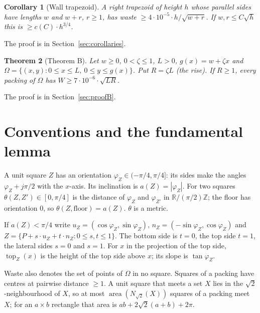 \documentclass[11pt,letterpaper]{amsart}
\theoremstyle{plain}
\newtheorem{theorem}{Theorem}[section]
\newtheorem{corollary}[theorem]{Corollary}
\theoremstyle{definition}
\theoremstyle{remark}
\begin{document}
\begin{corollary}[Wall trapezoid]\label{cor:wall}
A right trapezoid of height $h$ whose parallel sides have lengths $w$ and $w+r$, $r\ge1$, has waste $\ge4\cdot10^{-5}\cdot h/\sqrt{w+r}$. If $w,r\le C\sqrt h$ this is $\ge c(C)\cdot h^{3/4}$.
\end{corollary}
The proof is in Section~\ref{sec:corollaries}.

\begin{theorem}[Theorem B]\label{thm:B}
Let $w\ge0$, $0<\zeta\le1$, $L>0$, $g(x)=w+\zeta x$ and $\Omega=\{(x,y):0\le x\le L,\ 0\le y\le g(x)\}$. Put $R=\zeta L$ (the rise). If $R\ge1$, every packing of $\Omega$ has $W\ge7\cdot10^{-6}\cdot\sqrt{LR}$.
\end{theorem}
The proof is in Section~\ref{sec:proofB}.

\section{Conventions and the fundamental lemma}\label{sec:conventions}
A unit square $Z$ has an orientation $\varphi_Z\in(-\pi/4,\pi/4]$: its sides make the angles $\varphi_Z+j\pi/2$ with the $x$-axis. Its inclination is $a(Z)=|\varphi_Z|$. For two squares $\theta(Z,Z')\in[0,\pi/4]$ is the distance of $\varphi_Z$ and $\varphi_{Z'}$ in $\mathbb R/(\pi/2)\mathbb Z$; the floor has orientation $0$, so $\theta(Z,\text{floor})=a(Z)$. $\theta$ is a metric.

If $a(Z)<\pi/4$ write $u_Z=(\cos\varphi_Z,\sin\varphi_Z)$, $n_Z=(-\sin\varphi_Z,\cos\varphi_Z)$ and $Z=\{P+s\cdot u_Z+t\cdot n_Z:0\le s,t\le1\}$. The bottom side is $t=0$, the top side $t=1$, the lateral sides $s=0$ and $s=1$. For $x$ in the projection of the top side, $\operatorname{top}_Z(x)$ is the height of the top side above $x$; its slope is $\tan\varphi_Z$.

Waste also denotes the set of points of $\Omega$ in no square. Squares of a packing have centres at pairwise distance $\ge1$. A unit square that meets a set $X$ lies in the $\sqrt2$-neighbourhood of $X$, so at most $\operatorname{area}(N_{\sqrt2}(X))$ squares of a packing meet $X$; for an $a\times b$ rectangle that area is $ab+2\sqrt2(a+b)+2\pi$.
\end{document}
